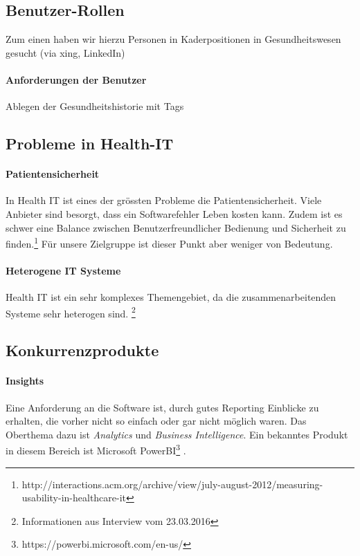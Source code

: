 \documentclass[a4paper]{scrreprt}
\begin{document}
\subsection{Benutzer-Rollen}
Zum einen haben wir hierzu Personen in Kaderpositionen in Gesundheitswesen gesucht (via xing, LinkedIn) 




\paragraph{Anforderungen der Benutzer}
Ablegen der Gesundheitshistorie mit Tags


\subsection{Probleme in Health-IT}
\paragraph{Patientensicherheit} In Health IT ist eines der grössten Probleme die Patientensicherheit. Viele Anbieter sind besorgt, dass ein Softwarefehler Leben kosten kann. Zudem ist es schwer eine Balance zwischen Benutzerfreundlicher Bedienung und Sicherheit zu finden.\footnote{http://interactions.acm.org/archive/view/july-august-2012/measuring-usability-in-healthcare-it}
Für unsere Zielgruppe ist dieser Punkt aber weniger von Bedeutung.

\paragraph{Heterogene IT Systeme} Health IT ist ein sehr komplexes Themengebiet, da die zusammenarbeitenden Systeme sehr heterogen sind. \footnote{Informationen aus Interview vom 23.03.2016}



\subsection{Konkurrenzprodukte}
\paragraph{Insights} Eine Anforderung an die Software ist, durch gutes Reporting Einblicke zu erhalten, die vorher nicht so einfach oder gar nicht möglich waren. Das Oberthema dazu ist \textit{Analytics} und \textit{Business Intelligence}. Ein bekanntes Produkt in diesem Bereich ist Microsoft PowerBI\footnote{https://powerbi.microsoft.com/en-us/} .
\end{document}

